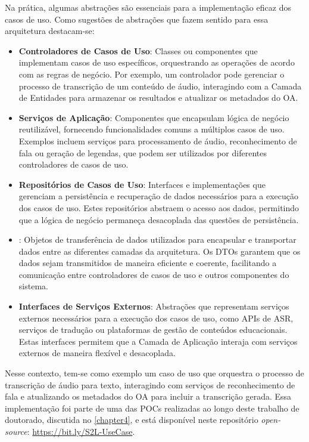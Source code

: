 Na prática, algumas abstrações são essenciais para a implementação eficaz dos casos de uso. Como sugestões de abstrações que fazem sentido para essa arquitetura destacam-se:

\begin{itemize}
    \item \textbf{Controladores de Casos de Uso}: Classes ou componentes que implementam casos de uso específicos, orquestrando as operações de acordo com as regras de negócio. Por exemplo, um controlador pode gerenciar o processo de transcrição de um conteúdo de áudio, interagindo com a Camada de Entidades para armazenar os resultados e atualizar os metadados do OA.

    \item \textbf{Serviços de Aplicação}: Componentes que encapsulam lógica de negócio reutilizável, fornecendo funcionalidades comuns a múltiplos casos de uso. Exemplos incluem serviços para processamento de áudio, reconhecimento de fala ou geração de legendas, que podem ser utilizados por diferentes controladores de casos de uso.

    \item \textbf{Repositórios de Casos de Uso}: Interfaces e implementações que gerenciam a persistência e recuperação de dados necessários para a execução dos casos de uso. Estes repositórios abstraem o acesso aos dados, permitindo que a lógica de negócio permaneça desacoplada das questões de persistência.

    \item \textbf{}: Objetos de transferência de dados utilizados para encapsular e transportar dados entre as diferentes camadas da arquitetura. Os DTOs garantem que os dados sejam transmitidos de maneira eficiente e coerente, facilitando a comunicação entre controladores de casos de uso e outros componentes do sistema.

    \item \textbf{Interfaces de Serviços Externos}: Abstrações que representam serviços externos necessários para a execução dos casos de uso, como APIs de ASR, serviços de tradução ou plataformas de gestão de conteúdos educacionais. Estas interfaces permitem que a Camada de Aplicação interaja com serviços externos de maneira flexível e desacoplada.
\end{itemize}

Nesse contexto, tem-se como exemplo um caso de uso que orquestra o processo de transcrição de áudio para texto, interagindo com serviços de reconhecimento de fala e atualizando os metadados do OA para incluir a transcrição gerada. Essa implementação foi parte de uma das POCs realizadas ao longo deste trabalho de doutorado, discutida no \autoref{chapter4}, e está disponível neste repositório \textit{open-source}: \url{https://bit.ly/S2L-UseCase}.

